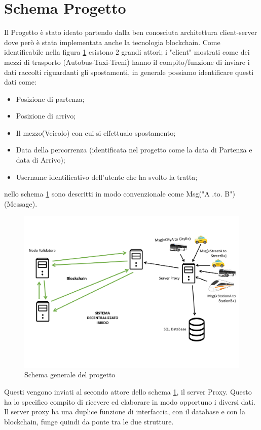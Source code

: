 \documentclass[11pt,a4paper,titlepage]{report}
\begin{document}
\section{Schema Progetto}\label{Schema-Progetto}
Il Progetto è stato ideato partendo dalla ben conosciuta architettura client-server dove però è stata implementata anche la tecnologia blockchain. Come identificabile nella figura \ref{fig:sch} esistono 2 grandi attori; i "client" mostrati come dei mezzi di trasporto (Autobus-Taxi-Treni) hanno il compito/funzione di inviare i dati raccolti riguardanti gli spostamenti, in generale possiamo identificare questi dati come: 
\begin{itemize}
\item Posizione di partenza;
\item Posizione di arrivo;
\item Il mezzo(Veicolo) con cui si effettualo spostamento;
\item Data della percorrenza (identificata nel progetto come la data di Partenza e data di Arrivo);
\item Username identificativo dell'utente che ha svolto la tratta;
\end{itemize}
nello schema \ref{fig:sch} sono descritti in modo convenzionale come Msg("A .to. B") (Message).
\begin{figure}[h]
	\includegraphics[width=\textwidth]{Schema_Progetto}
	\centering
	\caption{Schema generale del progetto}
	\label{fig:sch}
\end{figure}

Questi vengono inviati al secondo attore dello schema \ref{fig:sch}, il server Proxy. Questo ha lo specifico compito di ricevere ed elaborare in modo opportuno i diversi dati. Il server proxy ha una duplice funzione di interfaccia, con il database e con la blockchain, funge quindi da ponte tra le due strutture.
\end{document}
